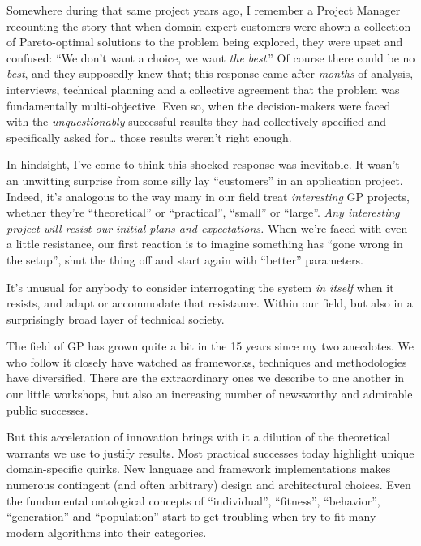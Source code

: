 Somewhere during that same project years ago, I remember a Project Manager recounting the story that when domain expert customers were shown a collection of Pareto-optimal solutions to the problem being explored, they were upset and confused: ``We don't want a choice, we want \emph{the best}.'' Of course there could be no \emph{best}, and they supposedly knew that; this response came after \emph{months} of analysis, interviews, technical planning and a collective agreement that the problem was fundamentally multi-objective. Even so, when the decision-makers were faced with the \emph{unquestionably} successful results they had collectively specified and specifically asked for\ldots{} those results weren't right enough.

In hindsight, I've come to think this shocked response was inevitable. It wasn't an unwitting surprise from some silly lay ``customers'' in an application project. Indeed, it's analogous to the way many in our field treat \emph{interesting} GP projects, whether they're ``theoretical'' or ``practical'', ``small'' or ``large''. \emph{Any interesting project will resist our initial plans and expectations.} When we're faced with even a little resistance, our first reaction is to imagine something has ``gone wrong in the setup'', shut the thing off and start again with ``better'' parameters.

It's unusual for anybody to consider interrogating the system \emph{in itself} when it resists, and adapt or accommodate that resistance. Within our field, but also in a surprisingly broad layer of technical society.

The field of GP has grown quite a bit in the 15 years since my two anecdotes. We who follow it closely have watched as frameworks, techniques and methodologies have diversified. There are the extraordinary ones we describe to one another in our little workshops, but also an increasing number of newsworthy and admirable public successes.

But this acceleration of innovation brings with it a dilution of the theoretical warrants we use to justify results. Most practical successes today highlight unique domain-specific quirks. New language and framework implementations makes numerous contingent (and often arbitrary) design and architectural choices. Even the fundamental ontological concepts of ``individual'', ``fitness'', ``behavior'', ``generation'' and ``population'' start to get troubling when try to fit many modern algorithms into their categories.

